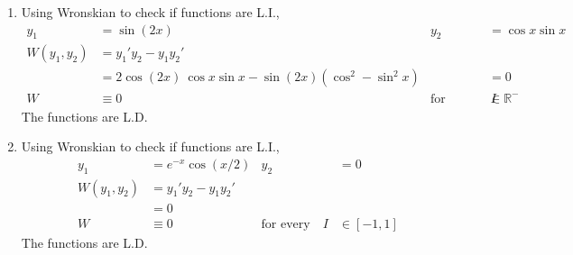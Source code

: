\begin{enumerate}
    \item Using Wronskian to check if functions are L.I.,
          \begin{align}
              y_{1}           & = \sin (2x)                                                   & y_{2}                    & = \cos x \sin x    \\
              W(y_{1}, y_{2}) & = y_{1}'y_{2} - y_{1}y_{2}'                                                                                   \\
                              & = 2\cos(2x)\ \cos x \sin x - \sin(2x)(\cos ^{2} - \sin ^{2}x) &                          & = 0                \\
              W               & \equiv 0                                                      & \text{for every} \quad I & \in \mathbb{R}^{-}
          \end{align}
          The functions are L.D.

    \item Using Wronskian to check if functions are L.I.,
          \begin{align}
              y_{1}           & = e^{-x}\cos(x/2)           & y_{2}                    & = 0         \\
              W(y_{1}, y_{2}) & = y_{1}'y_{2} - y_{1}y_{2}'                                          \\
                              & = 0                                                                  \\
              W               & \equiv 0                    & \text{for every} \quad I & \in [-1, 1]
          \end{align}
          The functions are L.D.


\end{enumerate}
